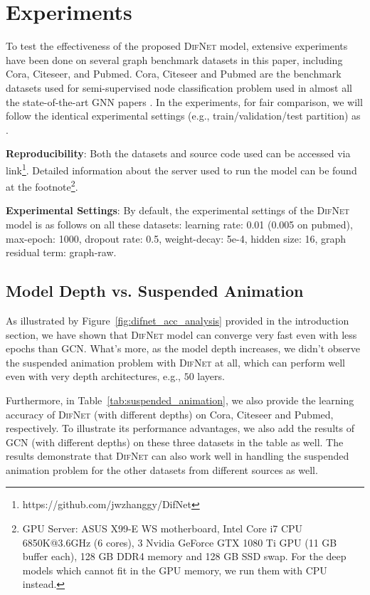 \documentclass{article}
\newcommand{\our}{\textsc{DifNet}}
\newcommand{\gcn}{\textsc{GCN}}
\begin{document}
\section{Experiments}\label{sec:experiment}
 
To test the effectiveness of the proposed {\our} model, extensive experiments have been done on several graph benchmark datasets in this paper, including Cora, Citeseer, and Pubmed. Cora, Citeseer and Pubmed are the benchmark datasets used for semi-supervised node classification problem used in almost all the state-of-the-art GNN papers \cite{Kipf_Semi_CORR_16,Velickovic_Graph_ICLR_18,Zhang_GResNet_19}. In the experiments, for fair comparison, we will follow the identical experimental settings (e.g., train/validation/test partition) as \cite{Kipf_Semi_CORR_16}.

\noindent \textbf{Reproducibility}: Both the datasets and source code used can be accessed via link\footnote{https://github.com/jwzhanggy/DifNet}. Detailed information about the server used to run the model can be found at the footnote\footnote{GPU Server: ASUS X99-E WS motherboard, Intel Core i7 CPU 6850K@3.6GHz (6 cores), 3 Nvidia GeForce GTX 1080 Ti GPU (11 GB buffer each), 128 GB DDR4 memory and 128 GB SSD swap. For the deep models which cannot fit in the GPU memory, we run them with CPU instead.}.

\noindent \textbf{Experimental Settings}: By default, the experimental settings of the {\our} model is as follows on all these datasets: learning rate: 0.01 (0.005 on pubmed), max-epoch: 1000, dropout rate: 0.5, weight-decay: 5e{-4}, hidden size: 16, graph residual term: graph-raw.

\subsection{Model Depth vs. Suspended Animation}
 
As illustrated by Figure~\ref{fig:difnet_acc_analysis} provided in the introduction section, we have shown that {\our} model can converge very fast even with less epochs than {\gcn}. What's more, as the model depth increases, we didn't observe the suspended animation problem with {\our} at all, which can perform well even with very depth architectures, e.g., $50$ layers.

Furthermore, in Table~\ref{tab:suspended_animation}, we also provide the learning accuracy of {\our} (with different depths) on Cora, Citeseer and Pubmed, respectively. To illustrate its performance advantages, we also add the results of {\gcn} (with different depths) on these three datasets in the table as well. The results demonstrate that {\our} can also work well in handling the suspended animation problem for the other datasets from different sources as well.
\end{document}
